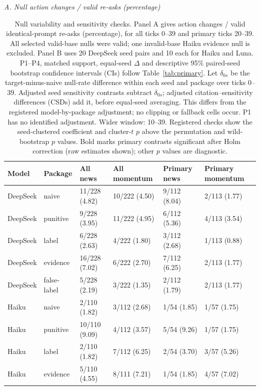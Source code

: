 \begin{table}[tbp]
\caption{Null variability and sensitivity checks. Panel A gives action changes / valid identical-prompt re-asks (percentage), for all ticks 0--39 and primary ticks 20--39. All selected valid-base nulls were valid; one invalid-base Haiku evidence null is excluded. Panel B uses 20 DeepSeek seed pairs and 10 each for Haiku and Luna. P1--P4, matched support, equal-seed $\Delta$ and descriptive 95\% paired-seed bootstrap confidence intervals (CIs) follow Table~\ref{tab:primary}. Let $\delta_{0s}$ be the target-minus-naive null-rate difference within each seed and package over ticks 0--39. Adjusted seed sensitivity contrasts subtract $\delta_{0s}$; adjusted citation--sensitivity differences (CSDs) add it, before equal-seed averaging. This differs from the registered model-by-package adjustment; no clipping or fallback cells occur. P1 has no identified adjustment. Wider window: 10--39. Registered checks show the seed-clustered coefficient and cluster-$t$ $p$ above the permutation and wild-bootstrap $p$ values. Bold marks primary contrasts significant after Holm correction (raw estimates shown); other $p$ values are diagnostic.}
\label{tab:robustness}
\centering\footnotesize
\setlength{\tabcolsep}{3pt}
\renewcommand{\arraystretch}{1.0}
\textit{A. Null action changes / valid re-asks (percentage)}\par
\begin{tabularx}{\linewidth}{@{}llXXXX@{}}
\toprule
Model & Package & All news & All momentum & Primary news & Primary momentum \\
\midrule
DeepSeek & naive & 11/228 (4.82) & 10/222 (4.50) & 9/112 (8.04) & 2/113 (1.77) \\
DeepSeek & punitive & 9/228 (3.95) & 11/222 (4.95) & 6/112 (5.36) & 4/113 (3.54) \\
DeepSeek & label & 6/228 (2.63) & 4/222 (1.80) & 3/112 (2.68) & 1/113 (0.88) \\
DeepSeek & evidence & 16/228 (7.02) & 6/222 (2.70) & 7/112 (6.25) & 2/113 (1.77) \\
DeepSeek & false-label & 5/228 (2.19) & 3/222 (1.35) & 2/112 (1.79) & 2/113 (1.77) \\
Haiku & naive & 2/110 (1.82) & 3/112 (2.68) & 1/54 (1.85) & 1/57 (1.75) \\
Haiku & punitive & 10/110 (9.09) & 4/112 (3.57) & 5/54 (9.26) & 1/57 (1.75) \\
Haiku & label & 2/110 (1.82) & 7/112 (6.25) & 2/54 (3.70) & 3/57 (5.26) \\
Haiku & evidence & 5/110 (4.55) & 8/111 (7.21) & 1/54 (1.85) & 4/57 (7.02) \\

\end{tabularx}
\end{table}
